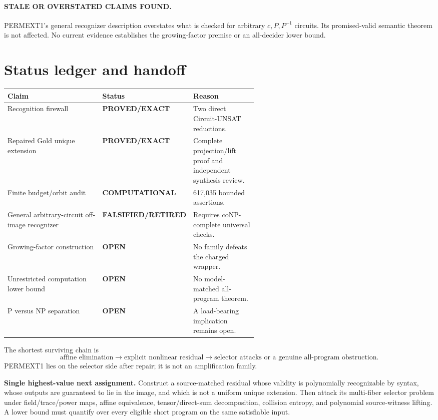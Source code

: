 \documentclass[11pt]{article}
\newcommand{\EXACT}{\textbf{PROVED/EXACT}}
\newcommand{\COMP}{\textbf{COMPUTATIONAL}}
\newcommand{\OPEN}{\textbf{OPEN}}
\newcommand{\RET}{\textbf{FALSIFIED/RETIRED}}
\begin{document}
\paragraph{STALE OR OVERSTATED CLAIMS FOUND.}
PERMEXT1's general recognizer description overstates what is checked for
arbitrary $c,P,P^{-1}$ circuits.  Its promised-valid semantic theorem is not
affected.  No current evidence establishes the growing-factor premise or an
all-decider lower bound.

\section{Status ledger and handoff}
\begin{center}
\begin{tabularx}{0.98\linewidth}{p{0.38\linewidth}p{0.20\linewidth}X}
\toprule
Claim & Status & Reason \\
\midrule
Recognition firewall & \EXACT & Two direct Circuit-UNSAT reductions. \\
Repaired Gold unique extension & \EXACT & Complete projection/lift proof and independent synthesis review. \\
Finite budget/orbit audit & \COMP & 617,035 bounded assertions. \\
General arbitrary-circuit off-image recognizer & \RET & Requires coNP-complete universal checks. \\
Growing-factor construction & \OPEN & No family defeats the charged wrapper. \\
Unrestricted computation lower bound & \OPEN & No model-matched all-program theorem. \\
P versus NP separation & \OPEN & A load-bearing implication remains open. \\
\bottomrule
\end{tabularx}
\end{center}

The shortest surviving chain is
\[
\text{affine elimination}
\longrightarrow
\text{explicit nonlinear residual}
\longrightarrow
\text{selector attacks or a genuine all-program obstruction}.
\]
PERMEXT1 lies on the selector side after repair; it is not an amplification
family.

\textbf{Single highest-value next assignment.}
Construct a source-matched residual whose validity is polynomially recognizable
by syntax, whose outputs are guaranteed to lie in the image, and which is not a
uniform unique extension.  Then attack its multi-fiber selector problem under
field/trace/power maps, affine equivalence, tensor/direct-sum decomposition,
collision entropy, and polynomial source-witness lifting.  A lower bound must
quantify over every eligible short program on the same satisfiable input.
\end{document}
